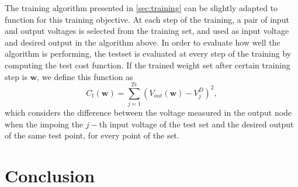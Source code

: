 \documentclass[reprint,superscriptaddress,prb,showkeys]{revtex4-2}
\newcommand{\brac}[1]{\left(#1 \right)} %
\begin{document}
The training algorithm presented in \cref{sec:training} can be slightly adapted to function for this training objective. At each step of the training, a pair of input and output voltages is selected from the training set, and used as input voltage and desired output in the algorithm above. In order to evaluate how well the algorithm is performing, the testset is evaluated at every step of the training by computing the test cost function. If the trained weight set after certain training step is $\boldsymbol{w}$, we define this function as
\[
C_{t}\left( \boldsymbol{w} \right) = \sum_{j=1}^{Te}\brac{V_{out}\brac{\boldsymbol{w}} - V_j^D}^2,
\]
which considers the difference between the voltage measured in the output node when the impoing the $j-$th input voltage of the test set and the desired output of the same test point, for every point of the set. 


\cleardoublepage
\section{Conclusion}

\appendix




\clearpage
 

\end{document}
